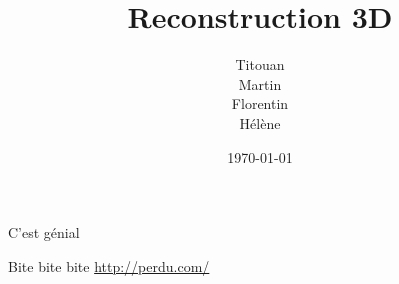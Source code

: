 \documentclass[a4paper]{article}
\author{
  Titouan \bsc{Christophe}\\
  Martin \bsc{Cornil}\\
  Florentin \bsc{Hennecker}\\
  Hélène \bsc{Plisnier}}
\date{\today}
\title{Reconstruction 3D}
\begin{document}
\maketitle

C'est génial \cite{bite}


\begin{thebibliography}{9}
      Bite bite bite
      \url{http://perdu.com/}
\end{thebibliography}
\end{document}
